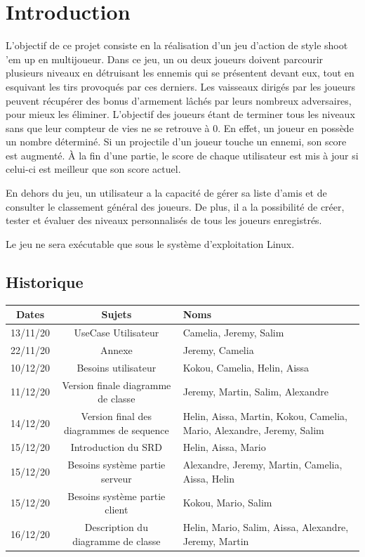\documentclass[a4paper,12pt]{article}
\begin{document}
\newpage

\tableofcontents

\newpage


\section{Introduction}

L’objectif de ce projet consiste en la réalisation d'un jeu d'action de style shoot 'em up en multijoueur. Dans ce jeu, un ou deux joueurs doivent parcourir plusieurs niveaux en détruisant les ennemis qui se présentent devant eux, tout en esquivant les tirs provoqués par ces derniers. Les vaisseaux dirigés par les joueurs peuvent récupérer des bonus d’armement lâchés par leurs nombreux adversaires, pour mieux les éliminer. L'objectif des joueurs étant de terminer tous les niveaux sans que leur compteur de vies ne se retrouve à 0. En effet, un joueur en possède un nombre déterminé. Si un projectile d'un joueur touche un ennemi, son score est augmenté. À la fin d'une partie, le score de chaque utilisateur est mis à jour si celui-ci est meilleur que son score actuel.

En dehors du jeu, un utilisateur a la capacité de gérer sa liste d'amis et de consulter le classement général des joueurs. De plus, il a la possibilité de créer, tester et évaluer des niveaux personnalisés de tous les joueurs enregistrés.

Le jeu ne sera exécutable que sous le système d'exploitation Linux.

\subsection{Historique}
\begin{tabularx}{16cm}{|c|c|X|}
	\hline
		Dates & Sujets & Noms \\
	\hline
		13/11/20 & UseCase Utilisateur & Camelia, Jeremy, Salim \\
	\hline
		22/11/20 & Annexe & Jeremy, Camelia \\
	\hline
		10/12/20 & Besoins utilisateur & Kokou, Camelia, Helin, Aissa\\
	\hline
		11/12/20 & Version finale diagramme de classe  & Jeremy, Martin, Salim, Alexandre\\
	\hline
		14/12/20 & Version final des diagrammes de sequence & Helin, Aissa, Martin, Kokou, Camelia, 
		Mario, Alexandre, Jeremy, Salim\\
	\hline
		15/12/20 & Introduction du SRD & Helin, Aissa, Mario\\
	\hline
		15/12/20 & Besoins système partie serveur & Alexandre, Jeremy, Martin, Camelia, Aissa, Helin\\
	\hline
		15/12/20 & Besoins système partie client & Kokou, Mario, Salim\\
	\hline
		16/12/20 & Description du diagramme de classe & Helin, Mario, Salim, Aissa,
		Alexandre, Jeremy, Martin\\
	\hline
\end{tabularx}
\end{document}
